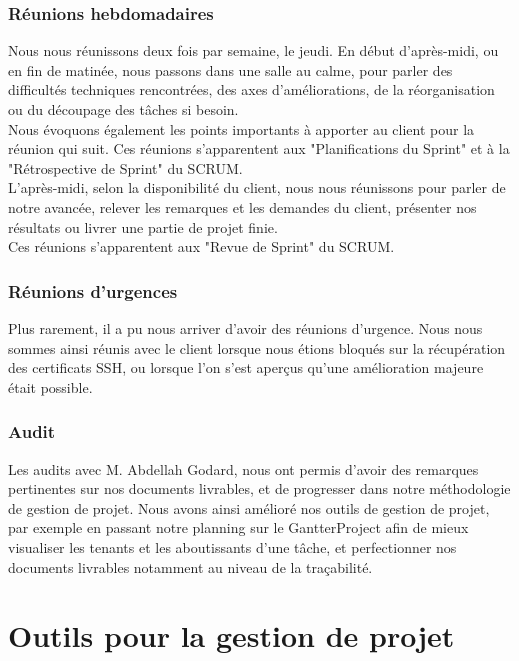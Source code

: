 \subsubsection{Réunions hebdomadaires}

Nous nous réunissons deux fois par semaine, le jeudi.
En début d'après-midi, ou en fin de matinée, nous passons dans une salle au calme, pour parler des difficultés techniques rencontrées, des axes d'améliorations, de la réorganisation ou du découpage des tâches si besoin.\\

Nous évoquons également les points importants à apporter au client pour la réunion qui suit. Ces réunions s'apparentent aux "Planifications du Sprint" et à la "Rétrospective de Sprint" du SCRUM.\\

L'après-midi, selon la disponibilité du client, nous nous réunissons pour parler de notre avancée, relever les remarques et les demandes du client, présenter nos résultats ou livrer une partie de projet finie.\\
Ces réunions s'apparentent aux "Revue de Sprint" du SCRUM.

\subsubsection{Réunions d'urgences}

Plus rarement, il a pu nous arriver d'avoir des réunions d'urgence. Nous nous sommes ainsi réunis avec le client lorsque nous étions bloqués sur la récupération des certificats SSH, ou lorsque l'on s'est aperçus qu'une amélioration majeure était possible.

\subsubsection{Audit}

Les audits avec M. Abdellah Godard, nous ont permis d'avoir des remarques pertinentes sur nos documents livrables, et de progresser dans notre méthodologie de gestion de projet. Nous avons ainsi amélioré nos outils de gestion de projet, par exemple en passant notre planning sur le GantterProject afin de mieux visualiser les tenants et les aboutissants d'une tâche, et perfectionner nos documents livrables notamment au niveau de la traçabilité.

\section{Outils pour la gestion de projet}

